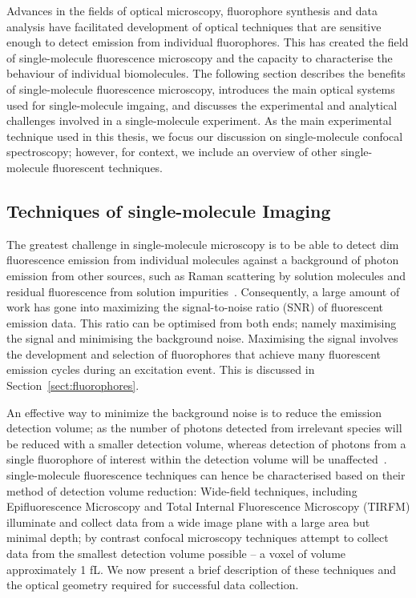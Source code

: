 Advances in the fields of optical microscopy, fluorophore synthesis and data analysis have facilitated development of optical techniques that are sensitive enough to detect emission from individual fluorophores. This has created the field of single-molecule fluorescence microscopy and the capacity to characterise the behaviour of individual biomolecules. The following section describes the benefits of single-molecule fluorescence microscopy, introduces the main optical systems used for single-molecule imgaing, and discusses the experimental and analytical challenges involved in a single-molecule experiment. As the main experimental technique used in this thesis, we focus our discussion on single-molecule confocal spectroscopy; however, for context, we include an overview of other single-molecule fluorescent techniques.  

\subsection{Techniques of single-molecule Imaging}
\label{subsect:techniques}
The greatest challenge in single-molecule microscopy is to be able to detect dim fluorescence emission from individual molecules against a background of photon emission from other sources, such as Raman scattering by solution molecules and residual fluorescence from solution impurities~\cite{Moerner2003}. Consequently, a large amount of work has gone into maximizing the signal-to-noise ratio (SNR) of fluorescent emission data. This ratio can be optimised from both ends; namely maximising the signal and minimising the background noise. Maximising the signal involves the development and selection of fluorophores that achieve many fluorescent emission cycles during an excitation event. This is discussed in Section~\ref{sect:fluorophores}. 

An effective way to minimize the background noise is to reduce the emission detection volume; as the number of photons detected from irrelevant species will be reduced with a smaller detection volume, whereas detection of photons from a single fluorophore of interest within the detection volume will be unaffected~\cite{Dillingham2008}. single-molecule fluorescence techniques can hence be characterised based on their method of detection volume reduction: Wide-field techniques, including Epifluorescence Microscopy and Total Internal Fluorescence Microscopy (TIRFM) illuminate and collect data from a wide image plane with a large area but minimal depth; by contrast confocal microscopy techniques attempt to collect data from the smallest detection volume possible -- a voxel of volume approximately 1 fL. We now present a brief description of these techniques and the optical geometry required for successful data collection. 

